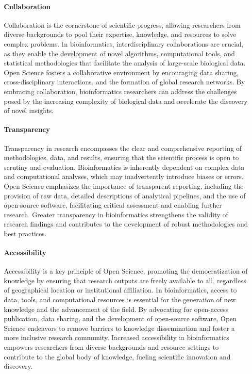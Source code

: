         \paragraph*{Collaboration}
            Collaboration is the cornerstone of scientific progress, allowing researchers from diverse backgrounds to pool their expertise, knowledge, and resources to solve complex problems. In bioinformatics, interdisciplinary collaborations are crucial, as they enable the development of novel algorithms, computational tools, and statistical methodologies that facilitate the analysis of large-scale biological data. Open Science fosters a collaborative environment by encouraging data sharing, cross-disciplinary interactions, and the formation of global research networks. By embracing collaboration, bioinformatics researchers can address the challenges posed by the increasing complexity of biological data and accelerate the discovery of novel insights.
    
        \paragraph*{Transparency}
            Transparency in research encompasses the clear and comprehensive reporting of methodologies, data, and results, ensuring that the scientific process is open to scrutiny and evaluation. Bioinformatics is inherently dependent on complex data and computational analyses, which may inadvertently introduce biases or errors. Open Science emphasizes the importance of transparent reporting, including the provision of raw data, detailed descriptions of analytical pipelines, and the use of open-source software, facilitating critical assessment and enabling further research. Greater transparency in bioinformatics strengthens the validity of research findings and contributes to the development of robust methodologies and best practices.
            
        \paragraph*{Accessibility}
            Accessibility is a key principle of Open Science, promoting the democratization of knowledge by ensuring that research outputs are freely available to all, regardless of geographical location or institutional affiliation. In bioinformatics, access to data, tools, and computational resources is essential for the generation of new knowledge and the advancement of the field. By advocating for open-access publication, data sharing, and the development of open-source software, Open Science endeavors to remove barriers to knowledge dissemination and foster a more inclusive research community. Increased accessibility in bioinformatics empowers researchers from diverse backgrounds and resource settings to contribute to the global body of knowledge, fueling scientific innovation and discovery.
        

